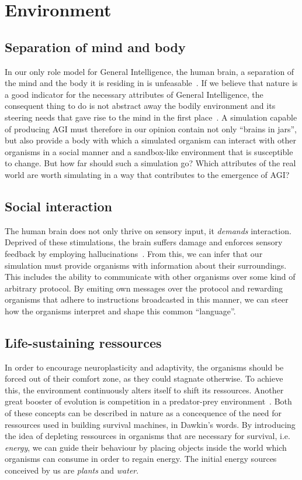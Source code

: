 \section{Environment}

\subsection{Separation of mind and body}
In our only role model for General Intelligence, the human brain, a separation of the mind and
the body it is residing in is unfeasable~\cite{Dudai2014}. If we believe that nature is a good 
indicator for the necessary attributes of General Intelligence, the consequent thing to do is not 
abstract away the bodily environment and its steering needs that gave rise to the mind in the first place~\cite{Jekely2010}. 
A simulation capable of producing AGI must therefore in our opinion contain not only ``brains in jars'', but 
also provide a body with which a simulated organism can interact with other organisms in a social manner and a 
sandbox-like environment that is susceptible to change.
But how far should such a simulation go? Which attributes of the real world are worth simulating in a way 
that contributes to the emergence of AGI\@?

\subsection{Social interaction}
The human brain does not only thrive on sensory input, it
\emph{demands} interaction. Deprived of these stimulations,
the brain suffers damage and enforces sensory feedback by employing
hallucinations~\cite{Grassian2006}. From this, we can infer that
our simulation must provide organisms with information about their surroundings.
This includes the ability to communicate with other organisms over some
kind of arbitrary protocol. By emiting own messages over the protocol and
rewarding organisms that adhere to instructions broadcasted in this manner,
we can steer how the organisms interpret and shape this common ``language''.

\subsection{Life-sustaining ressources}
In order to encourage neuroplasticity and adaptivity, the organisms should be 
forced out of their comfort zone, as they could stagnate otherwise.
To achieve this, the environment continuously alters itself to shift its ressources.
Another great booster of evolution is competition in a predator-prey environment~\cite{Dawkins1982}.
Both of these concepts can be described in nature as a concequence of the need for ressources 
used in building survival machines, in Dawkin's words. 
By introducing the idea of depleting ressources in organisms that are necessary for survival, 
i.e. \emph{energy}, we can guide their behaviour by placing objects inside the world which organisms can consume
in order to regain energy. The initial energy sources conceived by us are \emph{plants} and \emph{water}.


